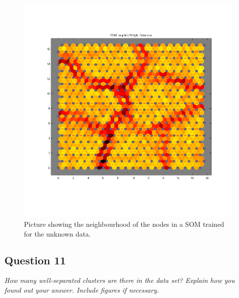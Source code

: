 \documentclass[a4paper]{article}
\begin{document}
 \begin{figure}[H] %
	 \includegraphics[scale=0.6]{20x20trainedUnknown.png}
	 \caption{\label{fig:20x20trainedUnknown} Picture showing the neighbourhood of the nodes in a SOM trained for the unknown data.}
 \end{figure}

\subsection*{Question 11}
\emph{How many well-separated clusters are there in the data set?
Explain how you found out your answer. Include figures if necessary.}
\end{document}

